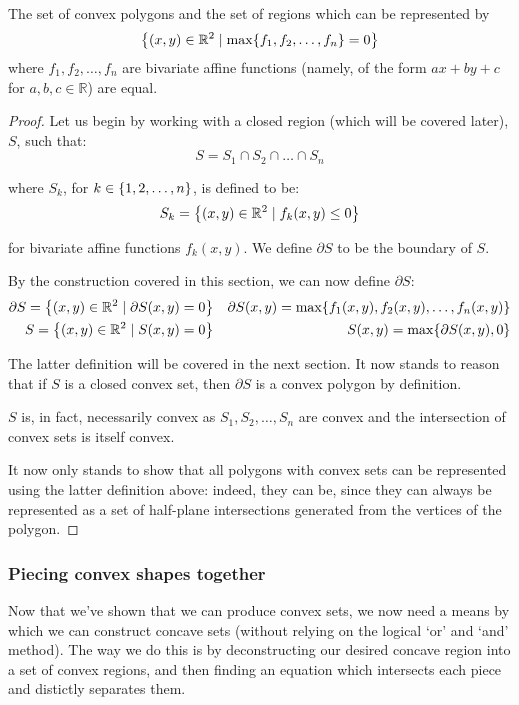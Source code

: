 \begin{theorem}
    \label{theorem:convex_polygons}
    The set of convex polygons and the set of regions which can be represented by
    $$
        \br*{(x,y)\in\mathbb{R}^2\mid \max\br*{f_1,f_2,\dots,f_n}=0}
    $$
    where $f_1,f_2,\dots,f_n$ are bivariate affine functions (namely, of the form $ax+by+c$ for $a,b,c\in\mathbb{R}$) are equal.

    \begin{proof}
        Let us begin by working with a closed region (which will be covered later), $S$, such that:
        $$
            S=S_1\cap S_2\cap \dots\cap S_n
        $$

        where $S_k$, for $k\in\br{1,2,\dots,n}$, is defined to be:
        $$
            S_k=\br*{(x,y)\in\mathbb{R}^2\mid f_k(x,y)\leq 0}
        $$

        for bivariate affine functions $f_k(x,y)$. We define $\partial S$ to be the boundary of $S$.

        By the construction covered in this section, we can now define $\partial S$:
        \begin{align*}
            \partial S = \br*{(x,y)\in\mathbb{R}^2\mid \partial S(x,y)=0} & & \partial S(x,y)=\max\br*{f_1(x,y),f_2(x,y),\dots,f_n(x,y)} \\
            S = \br*{(x,y)\in\mathbb{R}^2\mid S(x,y)=0} & & S(x,y)=\max\br{\partial S(x,y),0}
        \end{align*}

        The latter definition will be covered in the next section. It now stands to reason that if $S$ is a closed convex set, then $\partial S$ is a convex polygon by definition.

        $S$ is, in fact, necessarily convex as $S_1,S_2,\dots,S_n$ are convex and the intersection of convex sets is itself convex.

        It now only stands to show that all polygons with convex sets can be represented using the latter definition above: indeed, they can be, since they can always be represented as a set of half-plane intersections generated from the vertices of the polygon.
    \end{proof}
\end{theorem}

\subsubsection{Piecing convex shapes together}
Now that we've shown that we can produce convex sets, we now need a means by which we can construct concave sets (without relying on the logical `or' and `and' method). The way we do this is by deconstructing our desired concave region into a set of convex regions, and then finding an equation which intersects each piece and distictly separates them.

